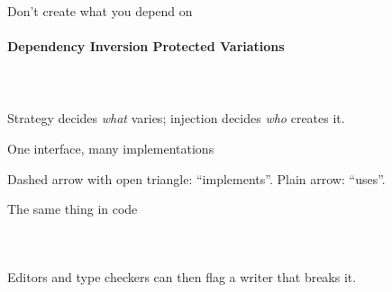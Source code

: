 \begin{frame}[fragile]{Don't create what you depend on}
    \framesubtitle{Dependency Inversion \textperiodcentered{} Protected Variations}

    \begin{columns}[T]
        \beforelabel
        \inputminted[highlightlines={3}]{python}{code/design/inject_before.py}

        \pause
        \afterlabel
        \inputminted[highlightlines={2,3,9,10,11}]{python}{code/design/inject_after.py}
    \end{columns}

    \vfill

    \begin{center}
    Strategy decides \textit{what} varies; injection decides \textit{who} creates it.
    \end{center}
\end{frame}





\begin{frame}{One interface, many implementations}


    \begin{center}
    \small Dashed arrow with open triangle: ``implements''. Plain arrow: ``uses''.
    \end{center}
\end{frame}




\begin{frame}[fragile]{The same thing in code}

    \begin{columns}[T]
        \inputminted[fontsize=\scriptsize]{python}{code/design/writer_interface.py}

        \inputminted[fontsize=\scriptsize, highlightlines={9,10}]{python}{code/design/writer_users.py}
    \end{columns}

    \vspace{0.8em}
    \begin{center}
    \small Editors and type checkers can then flag a writer that breaks it.
    \end{center}
\end{frame}




